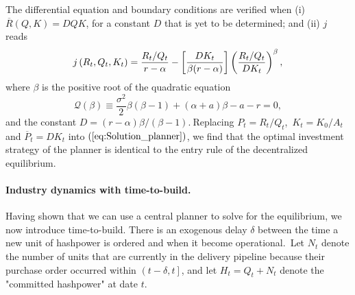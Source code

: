 \documentclass[12pt, a4paper]{article}
\begin{document}
The differential equation and boundary conditions are verified when (i) $%
\overline{R}(Q,K)=DQK$, for a constant $D$ that is yet to be determined; and
(ii) $j$ reads%
\begin{equation}
j\left( R_{t},Q_{t},K_{t}\right) =\frac{R_{t}/Q_{t}}{r-\alpha }-\left[ \frac{%
DK_{t}}{\beta (r-\alpha )}\right] \left( \frac{R_{t}/Q_{t}}{DK_{t}}\right)
^{\beta },  \label{eq:Solution_planner}
\end{equation}%
where $\beta $ is the positive root of the quadratic equation
\begin{equation*}
\mathcal{Q}(\beta )\equiv \frac{\sigma ^{2}}{2}\beta (\beta -1)+(\alpha
+a)\beta -a-r=0,
\end{equation*}%
and the constant $D=(r-\alpha )\beta /\left( \beta -1\right) .\ $Replacing $%
P_{t}=R_{t}/Q_{t}$,\ $K_{t}=K_{0}/A_{t}$ and $\overline{P}_{t}=DK_{t}$ into $%
\left( \ref{eq:Solution_planner}\right) $, we find that the optimal
investment strategy of the planner is identical to the entry rule of the
decentralized equilibrium.

\paragraph{Industry dynamics with time-to-build.}

Having shown that we can use a central planner to solve for the equilibrium,
we now introduce time-to-build. There is an exogenous delay $\delta $
between the time a new unit of hashpower is ordered and when it become
operational.\ Let $N_{t}$ denote the number of units that are currently in
the delivery pipeline because their purchase order occurred within $\left(
t-\delta ,t\right] $, and let $H_{t}=Q_{t}+N_{t}$ denote the "committed
hashpower" at date $t$.
\end{document}
